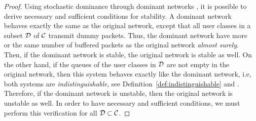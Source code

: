 \begin{proof}
    Using stochastic dominance through dominant networks \cite[Section~2.1.2]{kompella2014stable}, it is possible to derive necessary and sufficient conditions for stability.
    A dominant network behaves exactly the same as the original network, except that all user classes in a subset $\cal{D}$ of $\cal{C}$ transmit dummy packets.
    Thus, the dominant network have more or the same number of buffered packets as the original network  \textit{almost surely}.
    Then, if the dominant network is stable, the original network is stable as well. On the other hand, if the queues of the user classes in $\cal{D}$ are not empty in the original network, then this system behaves exactly like the dominant network, i.e, both systems are \emph{indistinguishable}, see Definition~\ref{def:indistinguishable} and \cite[Section~3.2]{szpankowski1994stability}.
    Therefore, if the dominant network is unstable, then the original network is unstable as well.
    In order to have necessary and sufficient conditions, we must perform this verification for all $\cal{D} \subset \cal{C}$.
    

\end{proof}

